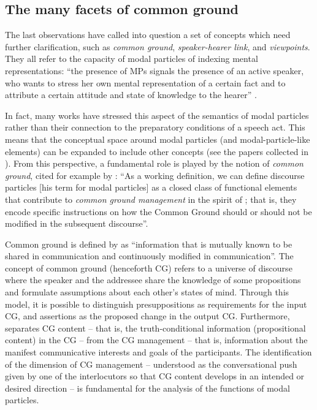 \subsection{The many facets of common ground}
\hypertarget{Toc124860621}{}
The last observations have called into question a set of concepts which need further clarification, such as \textit{common ground}, \textit{speaker-hearer link}, and \textit{viewpoints}. They all refer to the capacity of modal particles of indexing mental representations: “the presence of MPs signals the presence of an active speaker, who wants to stress her own mental representation of a certain fact and to attribute a certain attitude and state of knowledge to the hearer” \citep[283]{Coniglio2012}.

In fact, many works have stressed this aspect of the semantics of modal particles rather than their connection to the preparatory conditions of a speech act. This means that the conceptual space around modal particles (and modal-particle-like elements) can be expanded to include other concepts (see the papers collected in \citealt{AbrahamLeiss2012}). From this perspective, a fundamental role is played by the notion of \textit{common ground}, cited for example by \citet{Grosz2016}: “As a working definition, we can define discourse particles [his term for modal particles] as a closed class of functional elements that contribute to \textit{common ground management} in the spirit of \citet{Krifka2008}; that is, they encode specific instructions on how the Common Ground should or should not be modified in the subsequent discourse”.

Common ground is defined by \citet[245]{Krifka2008} as “information that is mutually known to be shared in communication and continuously modified in communication”. The concept of common ground (henceforth CG) refers to a universe of discourse where the speaker and the addressee share the knowledge of some propositions and formulate assumptions about each other’s states of mind. Through this model, it is possible to distinguish presuppositions as requirements for the input CG, and assertions as the proposed change in the output CG. Furthermore, \citet[246]{Krifka2008} separates CG content – that is, the truth-conditional information (propositional content) in the CG – from the CG management – that is, information about the manifest communicative interests and goals of the participants. The identification of the dimension of CG management – understood as the conversational push given by one of the interlocutors so that CG content develops in an intended or desired direction – is fundamental for the analysis of the functions of modal particles.

